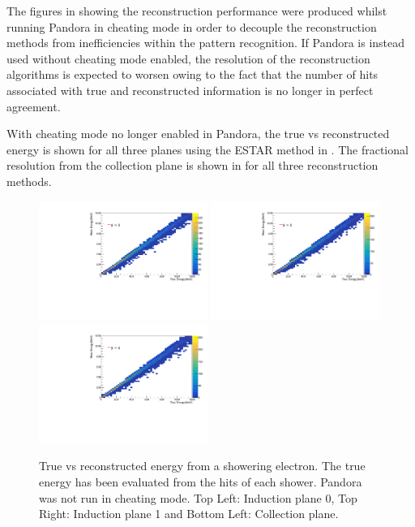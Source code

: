 The figures in  showing the reconstruction performance were produced whilst running Pandora in cheating mode in order to decouple the reconstruction methods from inefficiencies within the pattern recognition. If Pandora is instead used without cheating mode enabled, the resolution of the reconstruction algorithms is expected to worsen owing to the fact that the number of hits associated with true and reconstructed information is no longer in perfect agreement. 

With cheating mode no longer enabled in Pandora, the true vs reconstructed energy is shown for all three planes using the ESTAR method in . The fractional resolution from the collection plane is shown in  for all three reconstruction methods.

\begin{figure}[h!]
    \centering
    \includegraphics[width = 0.49\textwidth]{figures-chap4/non_cheat/ESTAR_plane0_true_vs_reco.pdf}
    \includegraphics[width = 0.49\textwidth]{figures-chap4/non_cheat/ESTAR_plane1_true_vs_reco.pdf}
    \includegraphics[width = 0.49\textwidth]{figures-chap4/non_cheat/ESTAR_plane2_true_vs_reco.pdf}
    \captionsetup{width=0.45\textwidth}
    \parbox[b]{0.49\textwidth}%
    {
    \caption[True vs reconstructed energy from the ESTAR method without using Pandora in cheating mode.]
    {True vs reconstructed energy from a showering electron. The true energy has been evaluated from the hits of each shower. Pandora was not run in cheating mode. Top Left: Induction plane 0, Top Right: Induction plane 1 and Bottom Left: Collection plane. \\}
    \label{fig:ESTAR_true_vs_reco_no_cheat}}
\end{figure}

